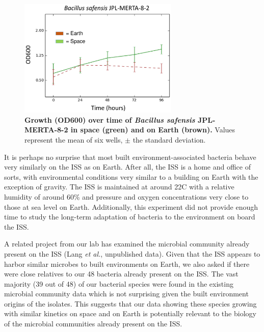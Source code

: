 \begin{figure}
    \centering
    \includegraphics[width=3in]{SpaceGrowth/figures/fig1}
    \caption{\textbf{Growth (OD600) over time of {\em Bacillus safensis} JPL-MERTA-8-2 in space (green) and on Earth (brown).} Values represent the mean of six wells, $\pm$ the standard deviation.}
    \label{SG_fig1}
\end{figure}

It is perhaps no surprise that most built environment-associated bacteria behave very similarly on the ISS as on Earth. After all, the ISS is a home and office of sorts, with environmental conditions very similar to a building on Earth with the exception of gravity. The ISS is maintained at around 22\degree C with a relative humidity of around 60\% and pressure and oxygen concentrations very close to those at sea level on Earth. Additionally, this experiment did not provide enough time to study the long-term adaptation of bacteria to the environment on board the ISS.

A related project from our lab has examined the microbial community already present on the ISS (Lang {\em et al.}, unpublished data). Given that the ISS appears to harbor similar microbes to built environments on Earth, we also asked if there were close relatives to our 48 bacteria already present on the ISS. The vast majority (39 out of 48) of our bacterial species were found in the existing microbial community data which is not surprising given the built environment origins of the isolates. This suggests that our data showing these species growing with similar kinetics on space and on Earth is potentially relevant to the biology of the microbial communities already present on the ISS.

